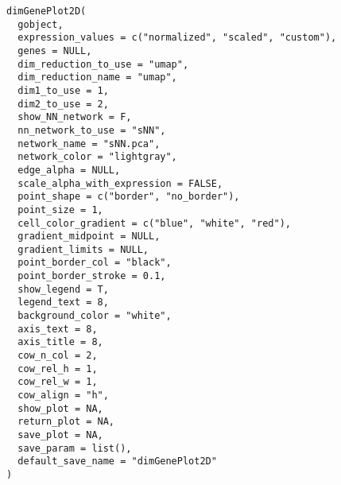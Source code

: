 \documentclass[a4paper]{book}
\begin{document}
%
\begin{Usage}
\begin{verbatim}
dimGenePlot2D(
  gobject,
  expression_values = c("normalized", "scaled", "custom"),
  genes = NULL,
  dim_reduction_to_use = "umap",
  dim_reduction_name = "umap",
  dim1_to_use = 1,
  dim2_to_use = 2,
  show_NN_network = F,
  nn_network_to_use = "sNN",
  network_name = "sNN.pca",
  network_color = "lightgray",
  edge_alpha = NULL,
  scale_alpha_with_expression = FALSE,
  point_shape = c("border", "no_border"),
  point_size = 1,
  cell_color_gradient = c("blue", "white", "red"),
  gradient_midpoint = NULL,
  gradient_limits = NULL,
  point_border_col = "black",
  point_border_stroke = 0.1,
  show_legend = T,
  legend_text = 8,
  background_color = "white",
  axis_text = 8,
  axis_title = 8,
  cow_n_col = 2,
  cow_rel_h = 1,
  cow_rel_w = 1,
  cow_align = "h",
  show_plot = NA,
  return_plot = NA,
  save_plot = NA,
  save_param = list(),
  default_save_name = "dimGenePlot2D"
)
\end{verbatim}
\end{Usage}
%
\end{document}
